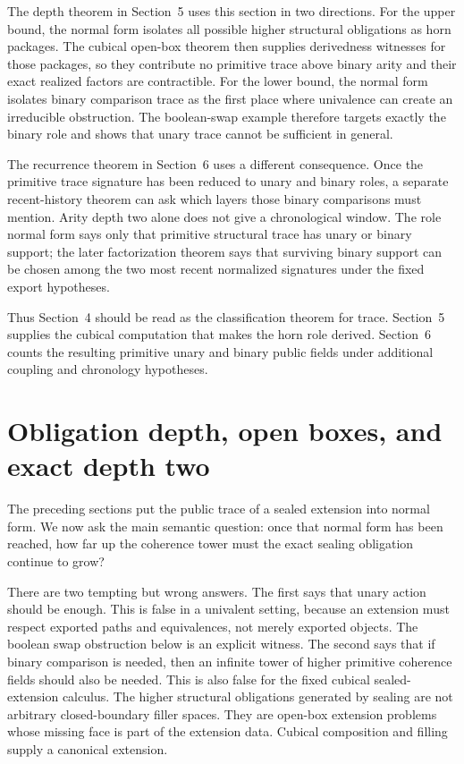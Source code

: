 \documentclass{lmcs}
\begin{document}
The depth theorem in Section~5 uses this section in two directions.  For the upper bound,
the normal form isolates all possible higher structural obligations as horn packages.  The
cubical open-box theorem then supplies derivedness witnesses for those packages, so they
contribute no primitive trace above binary arity and their exact realized factors are
contractible.  For the lower bound, the normal form isolates binary comparison trace as the
first place where univalence can create an irreducible obstruction.  The boolean-swap example
therefore targets exactly the binary role and shows that unary trace cannot be sufficient in
general.

The recurrence theorem in Section~6 uses a different consequence.  Once the primitive trace
signature has been reduced to unary and binary roles, a separate recent-history theorem can
ask which layers those binary comparisons must mention.  Arity depth two alone does not give
a chronological window.  The role normal form says only that primitive structural trace has
unary or binary support; the later factorization theorem says that surviving binary support
can be chosen among the two most recent normalized signatures under the fixed export
hypotheses.

Thus Section~4 should be read as the classification theorem for trace.  Section~5 supplies
the cubical computation that makes the horn role derived.  Section~6 counts the resulting
primitive unary and binary public fields under additional coupling and chronology hypotheses.

\section{Obligation depth, open boxes, and exact depth two}
\label{sec:depth-two}

The preceding sections put the public trace of a sealed extension into normal form.  We now
ask the main semantic question: once that normal form has been reached, how far up the
coherence tower must the exact sealing obligation continue to grow?

There are two tempting but wrong answers.  The first says that unary action should be
enough.  This is false in a univalent setting, because an extension must respect exported
paths and equivalences, not merely exported objects.  The boolean swap obstruction below is
an explicit witness.  The second says that if binary comparison is needed, then an infinite
tower of higher primitive coherence fields should also be needed.  This is also false for the
fixed cubical sealed-extension calculus.  The higher structural obligations generated by
sealing are not arbitrary closed-boundary filler spaces.  They are open-box extension
problems whose missing face is part of the extension data.  Cubical composition and filling
supply a canonical extension.
\end{document}
